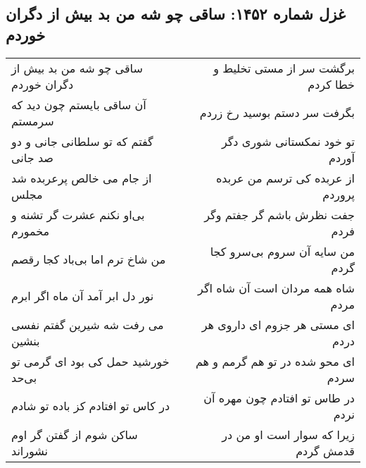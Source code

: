 \begin{center}
\section*{غزل شماره ۱۴۵۲: ساقی چو شه من بد بیش از دگران خوردم}
\label{sec:1452}
\begin{longtable}{l p{0.5cm} r}
ساقی چو شه من بد بیش از دگران خوردم
&&
برگشت سر از مستی تخلیط و خطا کردم
\\
آن ساقی بایستم چون دید که سرمستم
&&
بگرفت سر دستم بوسید رخ زردم
\\
گفتم که تو سلطانی جانی و دو صد جانی
&&
تو خود نمکستانی شوری دگر آوردم
\\
از جام می خالص پرعربده شد مجلس
&&
از عربده کی ترسم من عربده پروردم
\\
بی‌او نکنم عشرت گر تشنه و مخمورم
&&
جفت نظرش باشم گر جفتم وگر فردم
\\
من شاخ ترم اما بی‌باد کجا رقصم
&&
من سایه آن سروم بی‌سرو کجا گردم
\\
نور دل ابر آمد آن ماه اگر ابرم
&&
شاه همه مردان است آن شاه اگر مردم
\\
می رفت شه شیرین گفتم نفسی بنشین
&&
ای مستی هر جزوم ای داروی هر دردم
\\
خورشید حمل کی بود ای گرمی تو بی‌حد
&&
ای محو شده در تو هم گرمم و هم سردم
\\
در کاس تو افتادم کز باده تو شادم
&&
در طاس تو افتادم چون مهره آن نردم
\\
ساکن شوم از گفتن گر اوم نشوراند
&&
زیرا که سوار است او من در قدمش گردم
\\
\end{longtable}
\end{center}
